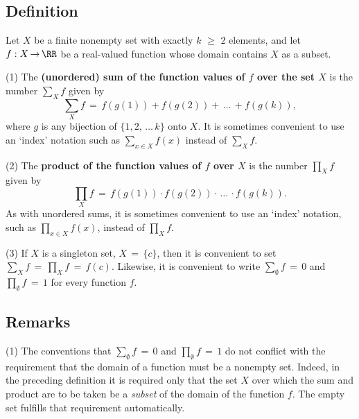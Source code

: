 \V

            \subsection{\small{\bf Definition}}
            \label{DefB10.50}

        Let $X$ be a finite nonempty set with exactly $k\,\,{\geq}\,\,2$ elements, and let $f:X \,{\rightarrow}\, {\RR}$ be a real-valued function whose domain contains $X$ as a subset.

\V

       (1) The {\bf (unordered) sum of the function values of $f$ over the set $X$} is the number $\sum_{X} f$ given by
        \begin{displaymath}
       \sum_{X} f \,=\, f(g(1)) + f(g(2)) + \,{\ldots}\,+ f(g(k)),
        \end{displaymath}
    where $g$ is any bijection of $\{1,2,\,{\ldots}\,k\}$ onto $X$. It is sometimes convenient to use an `index' notation such as $\sum_{x{\in}X} f(x)$ instead of $\sum_{X} f$.

\V

        (2) The {\bf product of the function values of $f$ over $X$} is the number $\prod_{X} f$ given by
        \begin{displaymath}
      {\prod}_{X} f \,=\, f(g(1)) {\cdot} f(g(2)) {\cdot} \,{\ldots}\,{\cdot} f(g(k)).
        \end{displaymath}
    As with unordered sums, it is sometimes convenient to use an `index' notation, such as $\prod_{x{\in}X} f(x)$, instead of $\prod_{X} f$.

\V

        (3) If $X$ is a singleton set, $X \,=\, \{c\}$, then it is convenient to set ${\sum}_{X} f \,=\, {\prod}_{X} f \,=\, f(c)$.
    Likewise, it is convenient to write $\sum_{{\emptyset}} f \,=\, 0$ and ${\prod}_{{\emptyset}} f \,=\, 1$ for every function $f$.


\V

            \subsection{\small{\bf Remarks}}
            \label{RemrkB10.53}

\V

\hspace*{\parindent}(1) The conventions that $\sum_{{\emptyset}} f \,=\, 0$ and ${\prod}_{{\emptyset}} f \,=\, 1$ do not conflict with the requirement that the domain of a function must be a nonempty set.
    Indeed, in the preceding definition it is required only that the set $X$ over which the sum and product are to be taken be a {\em subset} of the domain of the function $f$.
    The empty set fulfills that requirement automatically.

